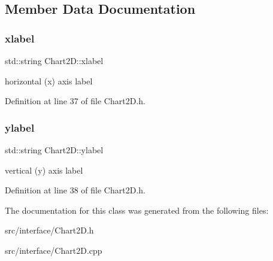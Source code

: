 \subsection{Member Data Documentation}
\mbox{\label{class_chart2_d_af463dc0d42e747ab4a208a44db003bd7}} 
\subsubsection{\texorpdfstring{xlabel}{xlabel}}
{\footnotesize\ttfamily std\+::string Chart2\+D\+::xlabel}

horizontal (x) axis label 

Definition at line 37 of file Chart2\+D.\+h.

\mbox{\label{class_chart2_d_afc4139568c9a63b3bcdc4eeefc0dd2e8}} 
\subsubsection{\texorpdfstring{ylabel}{ylabel}}
{\footnotesize\ttfamily std\+::string Chart2\+D\+::ylabel}

vertical (y) axis label 

Definition at line 38 of file Chart2\+D.\+h.



The documentation for this class was generated from the following files\+:\begin{DoxyCompactItemize}
\item 
src/interface/Chart2\+D.\+h\item 
src/interface/Chart2\+D.\+cpp\end{DoxyCompactItemize}
